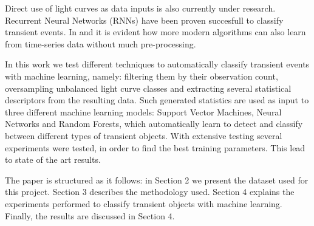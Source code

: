 Direct use of light curves as data inputs is also currently under research. Recurrent Neural Networks (RNNs) have been proven succesfull to classify transient events. In \cite{1606.07442} and \cite{1710.06804} it is evident how more modern algorithms can also learn from time-series data without much pre-processing.

In this work we test different techniques to automatically classify transient events with machine learning, namely: filtering them by their observation count, oversampling unbalanced light curve classes and extracting several statistical descriptors from the resulting data. Such generated statistics are used as input to three different machine learning models: Support Vector Machines, Neural Networks and Random Forests, which automatically learn to detect and classify between different types of transient objects. With extensive testing several experiments were tested, in order to find the best training parameters. This lead to state of the art results.

The paper is structured as it follows: in Section 2 we present the dataset used for this project. Section 3 describes the methodology used. Section 4 explains the experiments performed to classify transient objects with machine learning. Finally, the results are discussed in Section 4.